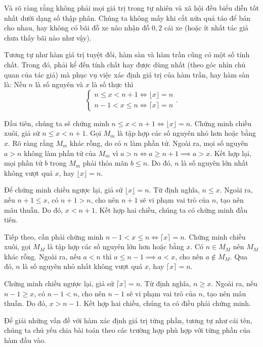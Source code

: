 Và rõ ràng rằng không phải mọi giá trị trong tự nhiên và xã hội đều biểu diễn tốt nhất dưới dạng số thập phân. Chúng ta không mấy khi cắt nửa quả táo để bán cho nhau, hay không có bãi đỗ xe nào nhận đỗ $0{,}2$ cái xe (hoặc ít nhất tác giả chưa thấy bãi nào như vậy).

Tương tự như hàm giá trị tuyệt đối, hàm sàn và hàm trần cũng có một số tính chất. Trong đó, phải kể đến tính chất hay được dùng nhất (theo góc nhìn chủ quan của tác giả) mà phục vụ việc xác định giá trị của hàm trần, hay hàm sàn là: Nếu $n$ là số nguyên và $x$ là số thực thì
\begin{equation*}
   \begin{cases}
      n \leq x < n + 1 \iff \lfloor x \rfloor = n \\
      n - 1 < x \leq n \iff \lceil x \rceil = n
   \end{cases}.
\end{equation*}

Đầu tiên, chúng ta sẽ chứng minh $n \leq x < n + 1 \iff \lfloor x \rfloor = n$. Chứng minh chiều xuôi, giả sử $n \leq x < n + 1$. Gọi $M_m$ là tập hợp các số nguyên nhỏ hơn hoặc bằng $x$. Rõ ràng rằng $M_m$ khác rỗng, do có $n$ làm phần tử. Ngoài ra, mọi số nguyên $a > n$ không làm phần tử của $M_m$ vì $a > n \iff a \geq n + 1 \implies a > x$. Kết hợp lại, mọi phần tử $b$ trong $M_m$ phải thỏa mãn $b \leq n$. Do đó, $n$ là số nguyên lớn nhất không vượt quá $x$, hay $\lfloor x \rfloor = n$.

Để chứng minh chiều ngược lại, giả sử $\lfloor x \rfloor = n$. Từ định nghĩa, $n \leq x$. Ngoài ra, nếu $n + 1 \leq x$, có $n + 1 > n$, cho nên $n + 1$ sẽ vi phạm vai trò của $n$, tạo nên mâu thuẫn. Do đó, $x < n + 1$. Kết hợp hai chiều, chúng ta có chứng minh đầu tiên.

Tiếp theo, cần phải chứng minh $n - 1 < x \leq n \iff \lceil x \rceil = n$. Chứng minh chiều xuôi, gọi $M_M$ là tập hợp các số nguyên lớn hơn hoặc bằng $x$. Có $n \in M_M$ nên $M_M$ khác rỗng. Ngoài ra, nếu $a < n$ thì $a \leq n - 1 \implies a < x$, cho nên $a \notin M_M$. Qua đó, $n$ là số nguyên nhỏ nhất không vượt quá $x$, hay $\lceil x \rceil = n$.

Chứng minh chiều ngược lại, giả sử $\lceil x \rceil = n$. Từ định nghĩa, $n \geq x$. Ngoài ra, nếu $n - 1 \geq x$, có $n - 1 < n$, cho nên $n - 1$ sẽ vi phạm vai trò của $n$, tạo nên mâu thuẫn. Do đó, $x > n - 1$. Kết hợp hai chiều, chúng ta có điều phải chứng minh.

Để giải những vấn đề với hàm xác định giá trị từng phần, tương tự như cái tên, chúng ta chủ yếu chia bài toán theo các trường hợp phù hợp với từng phần của hàm đầu vào.

